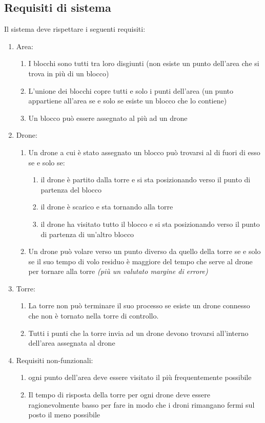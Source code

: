 \documentclass[a4paper, 11pt]{article}
\begin{document}
\subsection{Requisiti di sistema}
Il sistema deve rispettare i seguenti requisiti:
\begin{enumerate}
    \item Area:
    \begin{enumerate}[label=1.\arabic*]
        \item I blocchi sono tutti tra loro disgiunti (non esiste un punto dell'area che si trova in più di un blocco)
        \item L'unione dei blocchi copre tutti e solo i punti dell'area (un punto appartiene all'area se e solo se esiste un blocco che lo contiene)
        \item Un blocco può essere assegnato al più ad un drone 
    \end{enumerate}
    \item Drone:
    \begin{enumerate}[label=1.\arabic*]
        \item Un drone a cui è stato assegnato un blocco può trovarsi al di fuori di esso se e solo se:
        \begin{enumerate}
            \item il drone è partito dalla torre e si sta posizionando verso il punto di partenza del blocco
            \item il drone è scarico e sta tornando alla torre
            \item il drone ha visitato tutto il blocco e si sta posizionando verso il punto di partenza di un'altro blocco
        \end{enumerate}
        \item Un drone può volare verso un punto diverso da quello della torre se e solo se il suo tempo di volo residuo è maggiore del tempo che serve al drone per tornare alla torre \textit{(più un valutato margine di errore)}
    \end{enumerate}
    \item Torre:
    \begin{enumerate}[label=1.\arabic*]
        \item La torre non può terminare il suo processo se esiste un drone connesso che non è tornato nella torre di controllo.
        \item Tutti i punti che la torre invia ad un drone devono trovarsi all'interno dell'area assegnata al drone
    \end{enumerate}
    \item Requisiti non-funzionali:
    \begin{enumerate}[label=1.\arabic*]
        \item ogni punto dell'area deve essere visitato il più frequentemente possibile
        \item Il tempo di risposta della torre per ogni drone deve essere ragionevolmente basso per fare in modo che i droni rimangano fermi sul posto il meno possibile
    \end{enumerate} 
\end{enumerate}
\newpage
\end{document}
